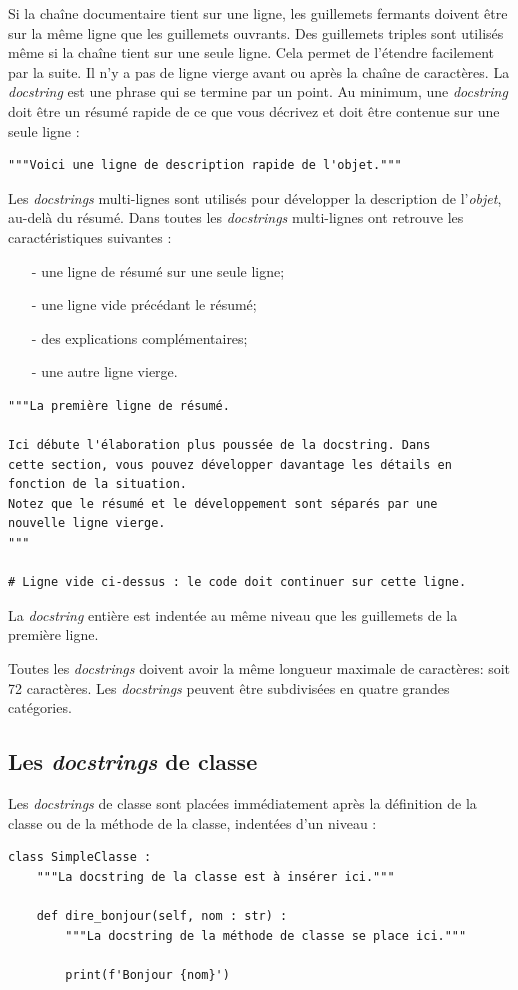 \documentclass[a4paper,11pt]{book}
\begin{document}
Si la chaîne documentaire tient sur une ligne, les guillemets fermants doivent être sur la même ligne que les guillemets ouvrants. Des guillemets triples sont utilisés même si la chaîne tient sur une seule ligne. Cela permet de l'étendre facilement par la suite. Il n'y a pas de ligne vierge avant ou après la chaîne de caractères. La \textit{docstring} est une phrase qui se termine par un point. Au minimum, une \textit{docstring} doit être un résumé rapide de ce que vous décrivez et doit être contenue sur une seule ligne :
\begin{lstlisting}
"""Voici une ligne de description rapide de l'objet."""
\end{lstlisting}
\medskip

Les \textit{docstrings} multi-lignes sont utilisés pour développer la description de l'\textit{objet}, au-delà du résumé. Dans toutes les \textit{docstrings} multi-lignes ont retrouve les caractéristiques suivantes :
\begin{itemize}
    \item[-] une ligne de résumé sur une seule ligne;
    \item[-] une ligne vide précédant le résumé;
    \item[-] des explications complémentaires;
    \item[-] une autre ligne vierge.
\end{itemize}
\medskip

\begin{lstlisting}
"""La première ligne de résumé.

Ici débute l'élaboration plus poussée de la docstring. Dans 
cette section, vous pouvez développer davantage les détails en 
fonction de la situation.
Notez que le résumé et le développement sont séparés par une 
nouvelle ligne vierge.
"""

# Ligne vide ci-dessus : le code doit continuer sur cette ligne.
\end{lstlisting}
\medskip

La \textit{docstring} entière est indentée au même niveau que les guillemets de la première ligne.
\medskip

Toutes les \textit{docstrings} doivent avoir la même longueur maximale de caractères: soit 72 caractères. Les \textit{docstrings} peuvent être subdivisées en quatre grandes catégories.
\medskip

\subsection*{Les \textit{docstrings} de classe}
Les \textit{docstrings} de classe sont placées immédiatement après la définition de la classe ou de la méthode de la classe, indentées d'un niveau :
\begin{lstlisting}
class SimpleClasse :
    """La docstring de la classe est à insérer ici."""

    def dire_bonjour(self, nom : str) :
        """La docstring de la méthode de classe se place ici."""

        print(f'Bonjour {nom}')
\end{lstlisting}
\medskip
\end{document}
